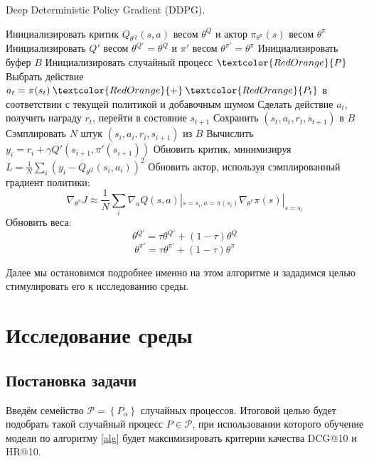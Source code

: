 \documentclass[14pt]{extarticle}
\begin{document}
\begin{algorithm}[H]
\caption{{Deep Deterministic Policy Gradient (DDPG).}}
\label{alg}
\begin{algorithmic}[1]
\STATE Инициализировать критик $Q_{\theta^{Q}}(s, a)$ весом $\theta^{Q}$ и актор $\pi_{\theta^{\pi}}(s)$ весом $\theta^{\pi}$
\STATE Инициализировать $Q'$ весом $\theta^{Q'} = \theta^{Q}$ и $\pi'$ весом $\theta^{\pi '} = \theta^{\pi}$
\STATE Инициализировать буфер $B$
\STATE Инициализировать случайный процесс $\textcolor{RedOrange}{P}$
\STATE Выбрать действие $a_t = \pi(s_t) \mathbin{\textcolor{RedOrange}{+}} \textcolor{RedOrange}{P_t}$ в соответствии с текущей политикой и добавочным шумом 
\STATE Сделать действие $a_t$, получить награду $r_t$, перейти в состояние $s_{t+1}$
\STATE Сохранить $(s_t, a_t, r_t, s_{t+1})$ в $B$
\STATE Сэмплировать $N$ штук $(s_i, a_i, r_i, s_{i+1})$ из $B$
\STATE Вычислить $y_i = r_i + \gamma Q'(s_{i+1}, \pi'(s_{i+1}))$
\STATE Обновить критик, минимизируя $L=\frac{1}{N}\sum\limits_i \left(y_i - Q_{\theta^{Q}}(s_i, a_i)\right)^2$
\STATE Обновить актор, используя сэмплированный градиент политики:
$$\nabla_{\theta^{\pi}} J \approx \frac{1}{N} \sum\limits_i \nabla_a Q(s, a)|_{s=s_i, a = \pi(s_i)}\nabla_{\theta^{\pi}} \pi (s)|_{s=s_i}$$
\STATE Обновить веса:
$$\theta^{Q'} = \tau \theta^{Q'} + (1-\tau) \theta^{Q}$$ $$\theta^{\pi'} = \tau \theta^{\pi'} + (1-\tau) \theta^{\pi}$$
\ENDFOR
\ENDFOR
\end{algorithmic}
\end{algorithm}

Далее мы остановимся подробнее именно на этом алгоритме и зададимся целью стимулировать его к исследованию среды.

\newpage

\section{Исследование среды}

\subsection{Постановка задачи}

Введём семейство $\mathscr{P} = \left\{P_{\alpha} \right\}$ случайных процессов. Итоговой целью будет подобрать такой случайный процесс $P\in \mathscr{P}$, при использовании которого обучение модели по алгоритму \ref{alg} будет максимизировать критерии качества DCG@10 и HR@10.
\end{document}
